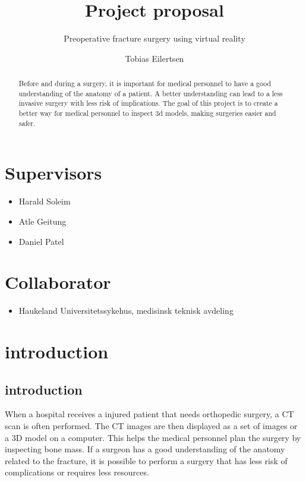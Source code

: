 \documentclass[12pt]{scrartcl}
\begin{document}
\title{Project proposal}
\subtitle{Preoperative fracture surgery using virtual reality}

\author{Tobias Eilertsen}
\maketitle


\section*{Supervisors}
\begin{itemize}
  \item Harald Soleim
  \item Atle Geitung
  \item Daniel Patel
\end{itemize}
\section*{Collaborator}
\begin{itemize}
  \item Haukeland Universitetssykehus, medisinsk teknisk avdeling
\end{itemize}

\begin{abstract}
Before and during a surgery, it is important for medical personnel to have a
good understanding of the anatomy of a patient. A better understanding can
lead to a less invasive surgery with less risk of implications.
The goal of this project is to create a better way for medical personnel to
inspect 3d models, making surgeries easier and safer.
\end{abstract}

\newpage
\section{introduction}


\subsection{introduction}

When a hospital receives a injured patient that needs orthopedic surgery, a CT scan is
often performed. The CT images are then displayed as a set of images or a 3D model on a computer. This helps
the medical personnel plan the surgery by inspecting bone mass.
If a surgeon has a good understanding of the anatomy related to the fracture,
it is possible to perform a surgery that has less risk of complications or requires less resources.
\end{document}
